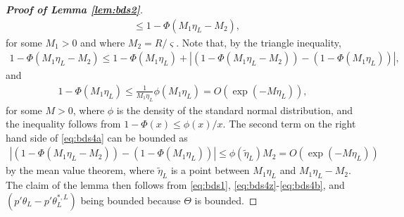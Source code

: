 \documentclass[letterpaper,11pt]{article}
\theoremstyle{myplain}
\theoremstyle{mydefinition}
\theoremstyle{myremark}
\numberwithin{equation}{section}
\numberwithin{figure}{section}
\begin{document}
\begin{appendix}
\begin{proof}[\rm \textbf{Proof of Lemma \ref{lem:bds2}}]
\begin{align}
&\le 1-\Phi(M_1\eta_L-M_2),\label{eq:bds4z}
\end{align}
for some $M_1>0$ and where $M_2=R/\varsigma$.
Note that, by the triangle inequality,
\begin{align}
   1-\Phi(M_1\eta_L-M_2)\le  1-\Phi(M_1\eta_L)+| (1-\Phi(M_1\eta_L-M_2))- (1-\Phi(M_1\eta_L))|,\label{eq:bds4a}
\end{align}
and
\begin{align}
   1-\Phi(M_1\eta_L)\le \frac{1}{M_1\eta_L} \phi(M_1\eta_L)=O(\exp(-M\eta_L)),\label{eq:bds4}
\end{align}
for some $M>0$, 
where $\phi$ is the density of the standard normal distribution, and the  inequality follows from $1-\Phi(x)\le \phi(x)/x$. The second term on the right hand side of \eqref{eq:bds4a}
can be bounded as
\begin{align}
  | (1-\Phi(M_1\eta_L-M_2))- (1-\Phi(M_1\eta_L))|\le \phi(\tilde\eta_L)M_2=O(\exp(-M\eta_L))\label{eq:bds4b}
\end{align}
by the mean value theorem, where $\tilde\eta_L$ is a point between $M_1\eta_L$ and $M_1\eta_L-M_2$.
 The claim of the lemma then follows from  \eqref{eq:bds1}, \eqref{eq:bds4z}-\eqref{eq:bds4b}, and $(p'\theta_L-p'\theta_L^{*,L})$ being bounded because $\Theta$ is bounded.


\end{proof}
\end{appendix}
\end{document}
